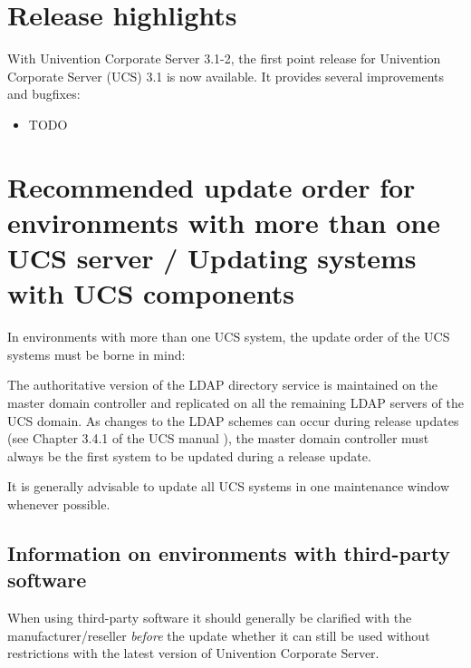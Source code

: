 


\newcommand{\ucsManualTitle}{UCS 3.1-2 Release Notes}
\newcommand{\ucsManualSubtitle}{Release notes for the installation and update of Univention Corporate Server (UCS) 3.1-2}
\newcommand{\ucsManualVersion}{3.1-2}
\newcommand{\ucsTechAuthor}{ & Univention GmbH & feedback@univention.de}

\setcounter{secnumdepth}{3}
\setcounter{tocdepth}{3}



\chapter{Release highlights}

With Univention Corporate Server 3.1-2, the first point release for
Univention Corporate Server (UCS) 3.1 is now available. It provides
several improvements and bugfixes:

\begin{itemize}
\item TODO %
\end{itemize}

\chapter{Recommended update order for environments with more than one UCS server / Updating systems with UCS components}

In environments with more than one UCS system, the update order of the
UCS systems must be borne in mind:

The authoritative version of the LDAP directory service
is maintained on the master domain controller and replicated on all the remaining
LDAP servers of the UCS domain. As changes to the LDAP schemes can
occur during release updates (see Chapter 3.4.1 of the UCS
manual \cite{UCS-Handbuch}), the master domain controller must always be the first
system to be updated during a release update.

It is generally advisable to update all UCS systems in one maintenance
window whenever possible. 

\section{Information on environments with third-party software}

When using third-party software it should generally be clarified with
the manufacturer/reseller \emph{before} the update whether it can still
be used without restrictions with the latest version of Univention
Corporate Server. 

